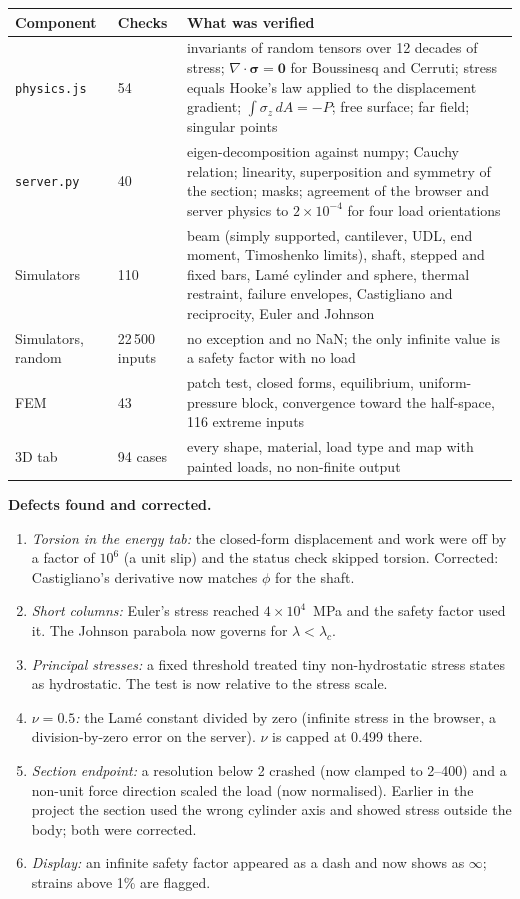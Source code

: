 \documentclass[11pt,a4paper]{article}
\newcommand{\tens}[1]{\bm{#1}}
\begin{document}
\begin{center}\small
\begin{tabular}{@{}p{3.0cm}p{1.9cm}p{8.4cm}@{}}\toprule
Component & Checks & What was verified\\\midrule
\texttt{physics.js} & 54 & invariants of random tensors over 12 decades of stress; $\nabla\!\cdot\tens\sigma=\mathbf 0$ for Boussinesq and Cerruti; stress equals Hooke's law applied to the displacement gradient; $\int\sigma_z\,dA=-P$; free surface; far field; singular points\\
\texttt{server.py} & 40 & eigen-decomposition against numpy; Cauchy relation; linearity, superposition and symmetry of the section; masks; agreement of the browser and server physics to $2\times10^{-4}$ for four load orientations\\
Simulators & 110 & beam (simply supported, cantilever, UDL, end moment, Timoshenko limits), shaft, stepped and fixed bars, Lam\'e cylinder and sphere, thermal restraint, failure envelopes, Castigliano and reciprocity, Euler and Johnson\\
Simulators, random & 22\,500 inputs & no exception and no NaN; the only infinite value is a safety factor with no load\\
FEM & 43 & patch test, closed forms, equilibrium, uniform-pressure block, convergence toward the half-space, 116 extreme inputs\\
3D tab & 94 cases & every shape, material, load type and map with painted loads, no non-finite output\\\bottomrule
\end{tabular}
\end{center}

\textbf{Defects found and corrected.}
\begin{enumerate}
\item \emph{Torsion in the energy tab:} the closed-form displacement and work were off by a factor of $10^6$ (a unit slip) and the status check skipped torsion. Corrected: Castigliano's derivative now matches $\phi$ for the shaft.
\item \emph{Short columns:} Euler's stress reached $4\times10^4$~MPa and the safety factor used it. The Johnson parabola now governs for $\lambda<\lambda_c$.
\item \emph{Principal stresses:} a fixed threshold treated tiny non-hydrostatic stress states as hydrostatic. The test is now relative to the stress scale.
\item \emph{$\nu=0.5$:} the Lam\'e constant divided by zero (infinite stress in the browser, a division-by-zero error on the server). $\nu$ is capped at 0.499 there.
\item \emph{Section endpoint:} a resolution below 2 crashed (now clamped to 2--400) and a non-unit force direction scaled the load (now normalised). Earlier in the project the section used the wrong cylinder axis and showed stress outside the body; both were corrected.
\item \emph{Display:} an infinite safety factor appeared as a dash and now shows as $\infty$; strains above 1\% are flagged.
\end{enumerate}
\end{document}
